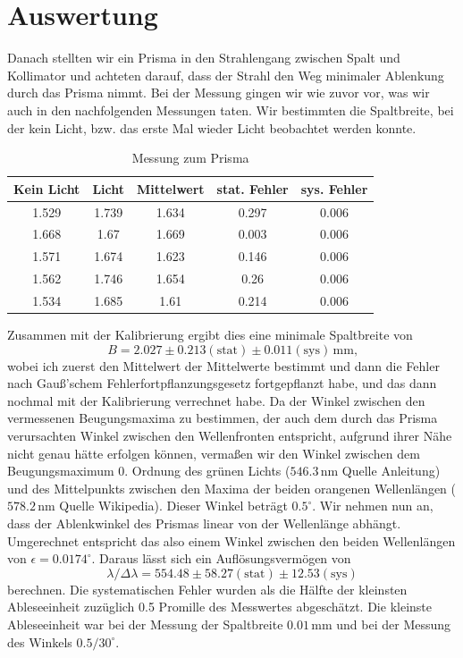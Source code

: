 \documentclass[a4paper, 12pt]{scrartcl}
\begin{document}
\section{Auswertung}
Danach stellten wir ein Prisma in den Strahlengang zwischen Spalt und Kollimator und achteten darauf, dass der Strahl den Weg minimaler Ablenkung durch das Prisma nimmt. Bei der Messung gingen wir wie zuvor vor, was wir auch in den nachfolgenden Messungen taten. Wir bestimmten die Spaltbreite, bei der kein Licht, bzw. das erste Mal wieder Licht beobachtet werden konnte.
\begin{table}[H]\begin{tabular}{c | c | c | c | c}
Kein Licht&Licht&Mittelwert&stat. Fehler&sys. Fehler\\\hline
1.529&1.739&1.634&0.297&0.006\\\hline
1.668&1.67&1.669&0.003&0.006\\\hline
1.571&1.674&1.623&0.146&0.006\\\hline
1.562&1.746&1.654&0.26&0.006\\\hline
1.534&1.685&1.61&0.214&0.006\\\hline
\end{tabular}\caption{Messung zum Prisma}\end{table}
Zusammen mit der Kalibrierung ergibt dies eine minimale Spaltbreite von $$B=2.027\pm0.213(\text{stat})\pm0.011(\text{sys})\,\text{mm,}$$
wobei ich zuerst den Mittelwert der Mittelwerte bestimmt und dann die Fehler nach Gauß'schem Fehlerfortpflanzungsgesetz fortgepflanzt habe, und das dann nochmal mit der Kalibrierung verrechnet habe. Da der Winkel zwischen den vermessenen Beugungsmaxima zu bestimmen, der auch dem durch das Prisma verursachten Winkel zwischen den Wellenfronten entspricht, aufgrund ihrer Nähe nicht genau hätte erfolgen können, vermaßen wir den Winkel zwischen dem Beugungsmaximum 0. Ordnung des grünen Lichts ($546.3\,\text{nm}$ Quelle Anleitung) und des Mittelpunkts zwischen den Maxima der beiden orangenen Wellenlängen ($578.2\,\text{nm}$ Quelle Wikipedia). Dieser Winkel beträgt $0.5^\circ$. Wir nehmen nun an, dass der Ablenkwinkel des Prismas linear von der Wellenlänge abhängt. Umgerechnet entspricht das also einem Winkel zwischen den beiden Wellenlängen von $\epsilon=0.0174^\circ$. Daraus lässt sich ein Auflösungsvermögen von $$\lambda/\Delta\lambda=554.48\pm58.27(\text{stat})\pm12.53(\text{sys})$$
berechnen. Die systematischen Fehler wurden als die Hälfte der kleinsten Ableseeinheit zuzüglich 0.5 Promille des Messwertes abgeschätzt. Die kleinste Ableseeinheit war bei der Messung der Spaltbreite $0.01\,\text{mm}$ und bei der Messung des Winkels $0.5/30^\circ$.\newline\newline
\end{document}
